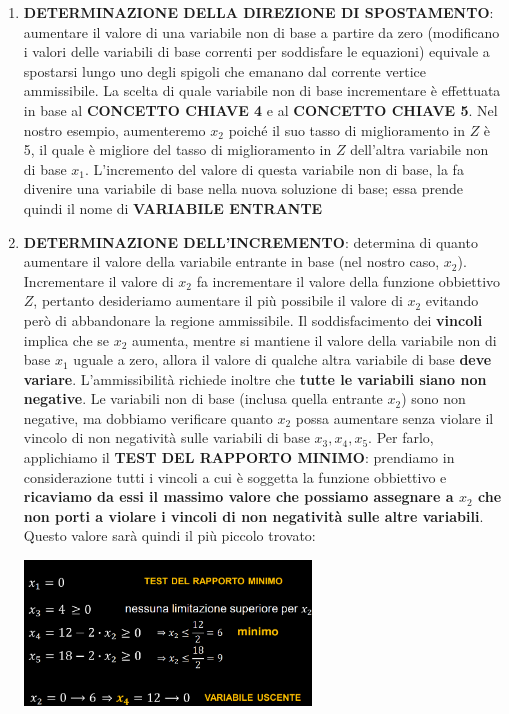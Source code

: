 \documentclass[12pt]{article}
\begin{document}
\begin{enumerate}
    \item \textbf{DETERMINAZIONE DELLA DIREZIONE DI SPOSTAMENTO}: \newline aumentare il valore di una variabile non di base a partire da zero (modificano i valori delle variabili di base correnti per soddisfare le equazioni) equivale a spostarsi lungo uno degli spigoli che emanano dal corrente vertice ammissibile.
    La scelta di quale variabile non di base incrementare è effettuata in base al \textbf{CONCETTO CHIAVE 4} e al \textbf{CONCETTO CHIAVE 5}. Nel nostro esempio, aumenteremo $x_2$ poiché il suo tasso di miglioramento in $Z$ è 5, il quale è migliore del tasso di miglioramento in $Z$ dell'altra variabile non di base $x_1$.
    L'incremento del valore di questa variabile non di base, la fa divenire una variabile di base nella nuova soluzione di base; essa prende quindi il nome di \textbf{VARIABILE ENTRANTE}
    \item \textbf{DETERMINAZIONE DELL'INCREMENTO}: determina di quanto aumentare il valore della variabile entrante in base (nel nostro caso, $x_2$). Incrementare il valore di $x_2$ fa incrementare il valore della funzione obbiettivo $Z$, pertanto desideriamo aumentare il più possibile il valore di $x_2$ evitando però di abbandonare la regione ammissibile.
    Il soddisfacimento dei \textbf{vincoli} implica che se $x_2$ aumenta, mentre si mantiene il valore della variabile non di base $x_1$ uguale a zero, allora il valore di qualche altra variabile di base \textbf{deve variare}. L'ammissibilità richiede inoltre che \textbf{tutte le variabili siano non negative}. Le variabili non di base (inclusa quella entrante $x_2$) sono non negative, ma dobbiamo verificare quanto $x_2$ possa aumentare senza violare il vincolo di non negatività sulle variabili
    di base $x_3, x_4, x_5$. Per farlo, applichiamo il \textbf{TEST DEL RAPPORTO MINIMO}: prendiamo in considerazione tutti i vincoli a cui è soggetta la funzione obbiettivo e \textbf{ricaviamo da essi il massimo valore che possiamo assegnare a $x_2$ che non porti a violare i vincoli di non negatività sulle altre variabili}. Questo valore sarà quindi il più piccolo trovato:
    \begin{center}
        \includegraphics[width = 0.60\textwidth]{Images/24.png}

\end{center}
\end{enumerate}
\end{document}
